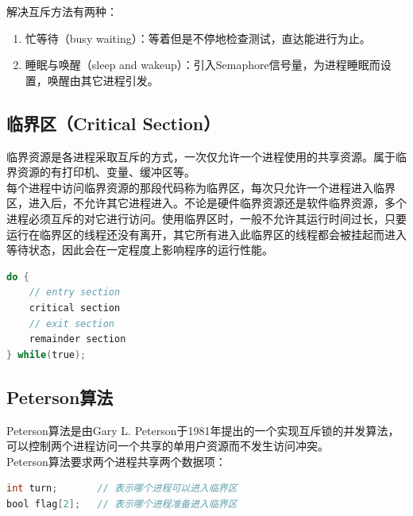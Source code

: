 解决互斥方法有两种：

\begin{enumerate}
    \item 忙等待（busy waiting）：等着但是不停地检查测试，直达能进行为止。

    \item 睡眠与唤醒（sleep and wakeup）：引入Semaphore信号量，为进程睡眠而设置，唤醒由其它进程引发。
\end{enumerate}

\vspace{0.5cm}

\subsection{临界区（Critical Section）}

临界资源是各进程采取互斥的方式，一次仅允许一个进程使用的共享资源。属于临界资源的有打印机、变量、缓冲区等。\\

每个进程中访问临界资源的那段代码称为临界区，每次只允许一个进程进入临界区，进入后，不允许其它进程进入。不论是硬件临界资源还是软件临界资源，多个进程必须互斥的对它进行访问。使用临界区时，一般不允许其运行时间过长，只要运行在临界区的线程还没有离开，其它所有进入此临界区的线程都会被挂起而进入等待状态，因此会在一定程度上影响程序的运行性能。\\


\begin{lstlisting}[language=C]
do {
	// entry section
	critical section
	// exit section
	remainder section
} while(true);
\end{lstlisting}

\vspace{0.5cm}

\subsection{Peterson算法}

Peterson算法是由Gary L. Peterson于1981年提出的一个实现互斥锁的并发算法，可以控制两个进程访问一个共享的单用户资源而不发生访问冲突。\\

Peterson算法要求两个进程共享两个数据项：\\


\begin{lstlisting}[language=C]
int turn;		// 表示哪个进程可以进入临界区
bool flag[2];	// 表示哪个进程准备进入临界区
\end{lstlisting}

